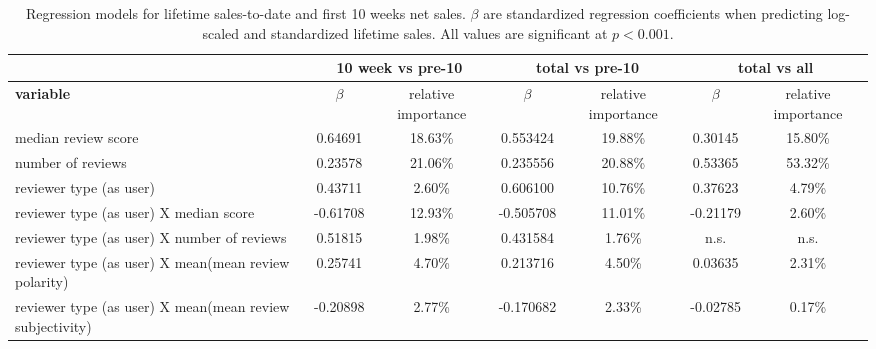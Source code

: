\documentclass[letterpaper]{article}
\begin{document}
\begin{table}[tb]
\centering
\scriptsize
\begin{tabular}{|l|c|c|c|c|c|c|}
\hline & \multicolumn{2}{|c|}{\textbf{10 week vs pre-10}} & \multicolumn{2}{|c|}{\textbf{total vs pre-10}} & \multicolumn{2}{|c|}{\textbf{total vs all}}\\ 
\hline \textbf{variable} & \textbf{$\beta$} & relative importance & \textbf{$\beta$} & relative importance & \textbf{$\beta$} & relative importance\\ 
\hline median review score & 0.64691 & 18.63\% & 0.553424 & 19.88\% & 0.30145 & 15.80\%\\ 
\hline number of reviews & 0.23578 & 21.06\% & 0.235556 & 20.88\% & 0.53365 & 53.32\%\\ 
\hline reviewer type (as user) & 0.43711 & 2.60\% & 0.606100 & 10.76\% & 0.37623 & 4.79\%\\ 
\hline reviewer type (as user) X median score  & -0.61708 & 12.93\% & -0.505708 & 11.01\% & -0.21179 & 2.60\%\\  
\hline reviewer type (as user) X number of reviews & 0.51815 & 1.98\% & 0.431584 & 1.76\% & n.s. & n.s. \\ 
\hline reviewer type (as user) X mean(mean review polarity) & 0.25741 & 4.70\% & 0.213716 & 4.50\% & 0.03635 & 2.31\%\\ 
\hline reviewer type (as user) X mean(mean review subjectivity) & -0.20898 & 2.77\% & -0.170682 & 2.33\% & -0.02785 & 0.17\%\\ 
\hline 
\end{tabular}
\caption{Regression models for lifetime sales-to-date and first 10 weeks net sales. $\beta$ are standardized regression coefficients when predicting log-scaled and standardized lifetime sales. All values are significant at $p < 0.001$.}
\label{tab:sales_allmodel_lm}
\end{table}

\end{document}
